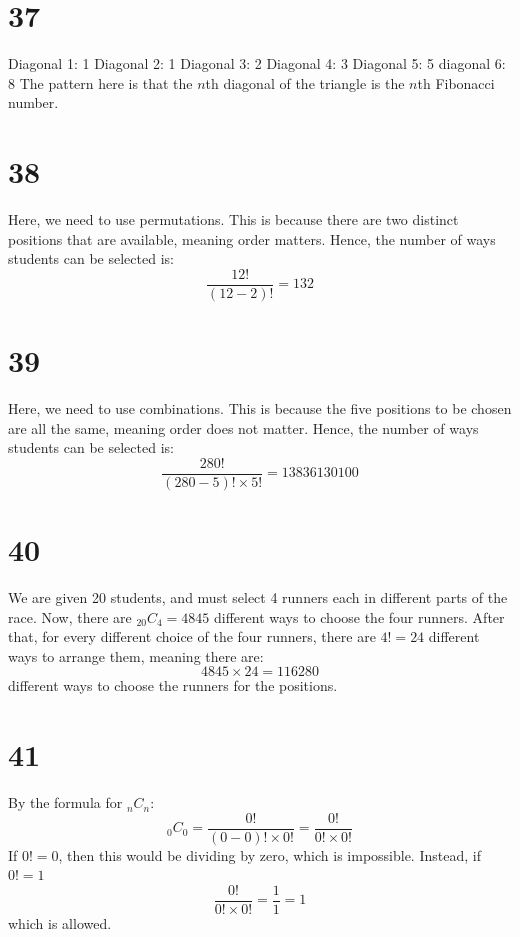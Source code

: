 \documentclass{article}
\theoremstyle{definition}
\newcommand{\?}{\stackrel{?}{=}}
\begin{document}
\section*{37}
Diagonal 1: 1\newline
Diagonal 2: 1\newline
Diagonal 3: 2\newline
Diagonal 4: 3\newline
Diagonal 5: 5\newline
diagonal 6: 8\newline
The pattern here is that the $n$th diagonal of the triangle is the $n$th Fibonacci number. 

\section*{38}
Here, we need to use permutations. This is because there are two distinct positions that are available, meaning order matters. Hence, the number of ways students can be selected is:
\[ \dfrac{12!}{\left(12-2\right)!}=132 \]

\section*{39}
Here, we need to use combinations. This is because the five positions to be chosen are all the same, meaning order does not matter. Hence, the number of ways students can be selected is:
\[ \dfrac{280!}{\left(280-5\right)!\times 5!}=13836130100 \]

\section*{40}
We are given 20 students, and must select 4 runners each in different parts of the race. Now, there are $_{20}C_4=4845$ different ways to choose the 
four runners. After that, for every different choice of the four runners, there are $4!=24$ different ways to arrange them, meaning there are:
\[ 4845\times 24=116280 \] different ways to choose the runners for the positions.

\section*{41}
By the formula for $_nC_n$:
\[ _0C_0=\frac{0!}{(0-0)!\times 0!}=\frac{0!}{0!\times 0!} \] If $0!=0$, then this would be dividing by zero, which is impossible. Instead, if $0!=1$
\[ \frac{0!}{0!\times 0!}=\frac{1}{1}=1 \] which is allowed.
\end{document}
